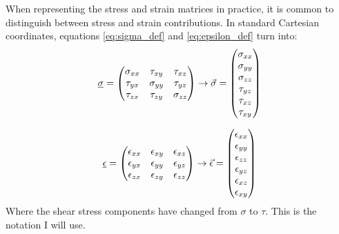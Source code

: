 When representing the stress and strain matrices in practice, it is common to distinguish between stress and strain contributions. In standard Cartesian coordinates, equations \ref{eq:sigma_def} and \ref{eq:epsilon_def} turn into:
\begin{equation}
	\uline{\sigma} = 
	\begin{pmatrix}
	\sigma_{xx} & \tau_{xy} & \tau_{xz} \\
	\tau_{yx} & \sigma_{yy} & \tau_{yz} \\
	\tau_{zx} & \tau_{zy} & \sigma_{zz} \\ 
	\end{pmatrix}
	\to 
	\vec{\sigma} = 
	\begin{pmatrix}
	\sigma_{xx} \\ \sigma_{yy} \\ \sigma_{zz} \\ \tau_{yz} \\ \tau_{xz} \\ \tau_{xy}
	\end{pmatrix}
\end{equation}

\begin{equation}
	\uline{\epsilon} = 
	\begin{pmatrix}
	\epsilon_{xx} & \epsilon_{xy} & \epsilon_{xz} \\
	\epsilon_{yx} & \epsilon_{yy} & \epsilon_{yz} \\
	\epsilon_{zx} & \epsilon_{zy} & \epsilon_{zz} \\ 
	\end{pmatrix}
	\to 
	\vec{\epsilon} = 
	\begin{pmatrix}
	\epsilon_{xx} \\ \epsilon_{yy} \\ \epsilon_{zz} \\ \epsilon_{yz} \\ \epsilon_{xz} \\ \epsilon_{xy}
	\end{pmatrix}
\end{equation}
Where the shear stress components have changed from $\sigma$ to $\tau$. This is the notation I will use.

